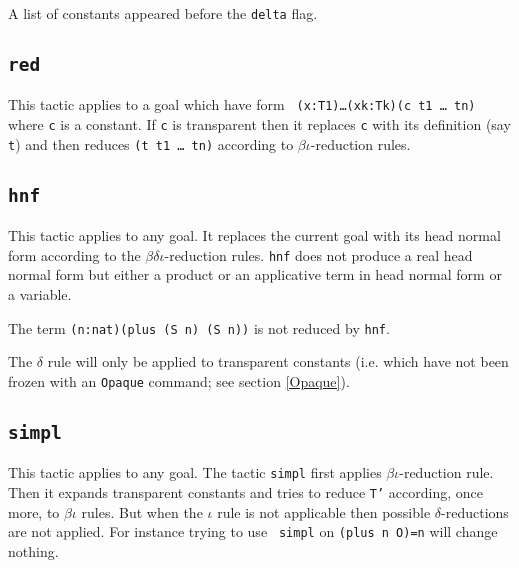 \begin{ErrMsgs}
\item {}
  
  A list of constants appeared before the {\tt delta} flag.
\end{ErrMsgs}


\subsection{{\tt red}}

This tactic applies to a goal which have form {\tt
  (x:T1)\dots(xk:Tk)(c t1 \dots\ tn)} where {\tt c} is a constant.  If
{\tt c} is transparent then it replaces {\tt c} with its definition
(say {\tt t}) and then reduces {\tt (t t1 \dots\ tn)} according to
$\beta\iota$-reduction rules.

\begin{ErrMsgs}
\item {}
\end{ErrMsgs}

\subsection{{\tt hnf}}

This tactic applies to any goal. It replaces the current goal with its
head normal form according to the $\beta\delta\iota$-reduction rules.
{\tt hnf} does not produce a real head normal form but either a
product or an applicative term in head normal form or a variable.

\Example
The term \verb+(n:nat)(plus (S n) (S n))+ is not reduced by {\tt hnf}.

\Rem The $\delta$ rule will only be applied to transparent constants
(i.e. which have not been frozen with an {\tt Opaque} command; see
section \ref{Opaque}).

\subsection{\tt simpl}

This tactic applies to any goal. The tactic {\tt simpl} first applies
$\beta\iota$-reduction rule.  Then it expands transparent constants
and tries to reduce {\tt T'} according, once more, to $\beta\iota$
rules. But when the $\iota$ rule is not applicable then possible
$\delta$-reductions are not applied.  For instance trying to use {\tt
  simpl} on {\tt (plus n O)=n} will change nothing.

